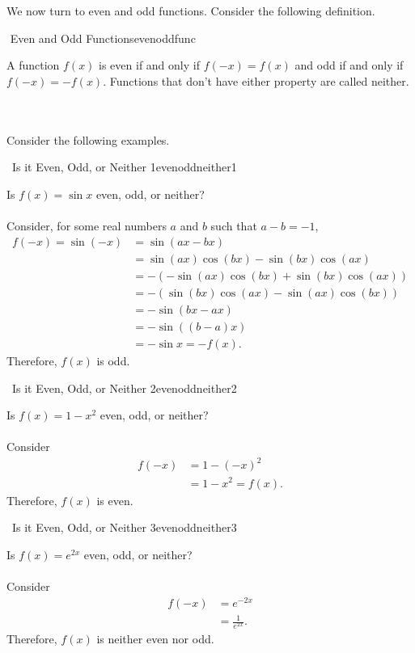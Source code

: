 		\vphantom
		\\
		\\
		We now turn to even and odd functions. Consider the following definition.
		\begin{definition}{\Stop\,\,Even and Odd Functions}{evenoddfunc}

			A function \(f(x)\) is even if and only if \(f(-x)=f(x)\) and odd if and only if \(f(-x)=-f(x)\). Functions that don't have either property are called neither.
			
		\end{definition}
		\pagebreak
		\vphantom
		\\
		\\
		Consider the following examples.
		\begin{example}{\Difficulty\,\Difficulty\,\,Is it Even, Odd, or Neither 1}{evenoddneither1}
			
			Is \(f(x)=\sin x\) even, odd, or neither?
			\\
			\\
			Consider, for some real numbers \(a\) and \(b\) such that \(a-b=-1\),
			\begin{align*}
				f(-x)=\sin(-x)&=\sin(ax-bx) \\
				&=\sin(ax)\cos(bx)-\sin(bx)\cos(ax) \\
				&=-(-\sin(ax)\cos(bx)+\sin(bx)\cos(ax)) \\
				&=-(\sin(bx)\cos(ax)-\sin(ax)\cos(bx)) \\
				&=-\sin(bx-ax) \\
				&=-\sin((b-a)x) \\
				&=-\sin x=-f(x).
			\end{align*}
			Therefore, \(f(x)\) is odd.

		\end{example}
		\begin{example}{\Difficulty\,\Difficulty\,\,Is it Even, Odd, or Neither 2}{evenoddneither2}
			
			Is \(f(x)=1-x^2\) even, odd, or neither?
			\\
			\\
			Consider
			\begin{align*}
				f(-x)&=1-(-x)^2 \\
				&=1-x^2=f(x).
			\end{align*}
			Therefore, \(f(x)\) is even.

		\end{example}
		\begin{example}{\Difficulty\,\Difficulty\,\,Is it Even, Odd, or Neither 3}{evenoddneither3}

			Is \(f(x)=e^{2x}\) even, odd, or neither?
			\\
			\\
			Consider
			\begin{align*}
				f(-x)&=e^{-2x} \\
				&=\frac{1}{e^{2x}}.
			\end{align*}
			Therefore, \(f(x)\) is neither even nor odd.
			
		\end{example}
